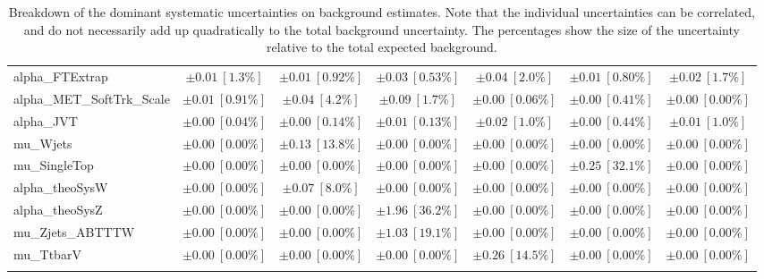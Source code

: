 \begin{sidewaystable}
\begin{center}
\begin{tabular*}{\textwidth}{@{\extracolsep{\fill}}lcccccc}
alpha\_FTExtrap         & $\pm 0.01\ [1.3\%] $          & $\pm 0.01\ [0.92\%] $          & $\pm 0.03\ [0.53\%] $          & $\pm 0.04\ [2.0\%] $          & $\pm 0.01\ [0.80\%] $          & $\pm 0.02\ [1.7\%] $       \\
alpha\_MET\_SoftTrk\_Scale         & $\pm 0.01\ [0.91\%] $          & $\pm 0.04\ [4.2\%] $          & $\pm 0.09\ [1.7\%] $          & $\pm 0.00\ [0.06\%] $          & $\pm 0.00\ [0.41\%] $          & $\pm 0.00\ [0.00\%] $       \\
alpha\_JVT         & $\pm 0.00\ [0.04\%] $          & $\pm 0.00\ [0.14\%] $          & $\pm 0.01\ [0.13\%] $          & $\pm 0.02\ [1.0\%] $          & $\pm 0.00\ [0.44\%] $          & $\pm 0.01\ [1.0\%] $       \\
mu\_Wjets         & $\pm 0.00\ [0.00\%] $          & $\pm 0.13\ [13.8\%] $          & $\pm 0.00\ [0.00\%] $          & $\pm 0.00\ [0.00\%] $          & $\pm 0.00\ [0.00\%] $          & $\pm 0.00\ [0.00\%] $       \\
mu\_SingleTop         & $\pm 0.00\ [0.00\%] $          & $\pm 0.00\ [0.00\%] $          & $\pm 0.00\ [0.00\%] $          & $\pm 0.00\ [0.00\%] $          & $\pm 0.25\ [32.1\%] $          & $\pm 0.00\ [0.00\%] $       \\
alpha\_theoSysW         & $\pm 0.00\ [0.00\%] $          & $\pm 0.07\ [8.0\%] $          & $\pm 0.00\ [0.00\%] $          & $\pm 0.00\ [0.00\%] $          & $\pm 0.00\ [0.00\%] $          & $\pm 0.00\ [0.00\%] $       \\
alpha\_theoSysZ         & $\pm 0.00\ [0.00\%] $          & $\pm 0.00\ [0.00\%] $          & $\pm 1.96\ [36.2\%] $          & $\pm 0.00\ [0.00\%] $          & $\pm 0.00\ [0.00\%] $          & $\pm 0.00\ [0.00\%] $       \\
mu\_Zjets\_ABTTTW         & $\pm 0.00\ [0.00\%] $          & $\pm 0.00\ [0.00\%] $          & $\pm 1.03\ [19.1\%] $          & $\pm 0.00\ [0.00\%] $          & $\pm 0.00\ [0.00\%] $          & $\pm 0.00\ [0.00\%] $       \\
mu\_TtbarV         & $\pm 0.00\ [0.00\%] $          & $\pm 0.00\ [0.00\%] $          & $\pm 0.00\ [0.00\%] $          & $\pm 0.26\ [14.5\%] $          & $\pm 0.00\ [0.00\%] $          & $\pm 0.00\ [0.00\%] $       \\
\noalign{\smallskip}\hline\noalign{\smallskip}
\end{tabular*}
\end{center}
\caption[Breakdown of uncertainty on background estimates]{
Breakdown of the dominant systematic uncertainties on background estimates.
Note that the individual uncertainties can be correlated, and do not necessarily add up quadratically to 
the total background uncertainty. The percentages show the size of the uncertainty relative to the total expected background.
\label{table.results.bkgestimate.uncertainties.SRA_TW_bybkg}}
\end{sidewaystable}
%
